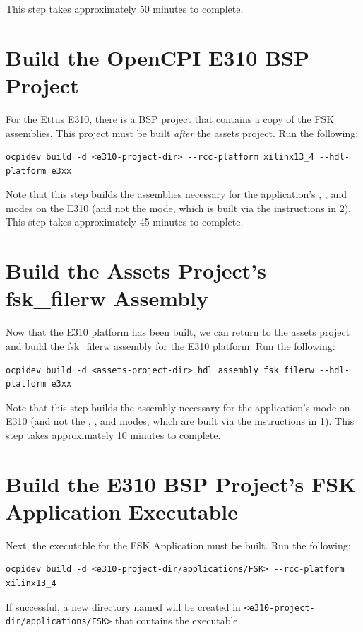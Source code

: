 \begin{flushleft}
This step takes approximately 50 minutes to complete.

\section{Build the OpenCPI E310 BSP Project}
\label{sec:build_bsp_asms}
For the Ettus E310, there is a BSP project that contains a copy of the FSK assemblies. This project must be built \textit{after} the assets project. Run the following:
\begin{lstlisting}
ocpidev build -d <e310-project-dir> --rcc-platform xilinx13_4 --hdl-platform e3xx
\end{lstlisting}
Note that this step builds the assemblies necessary for the application's , , and  modes on the E310 (and not the  mode, which is built via the instructions in \ref{sec:build_assets_asm}).
This step takes approximately 45 minutes to complete.

\section{Build the Assets Project's fsk\_filerw Assembly}
\label{sec:build_assets_asm}
Now that the E310 platform has been built, we can return to the assets project and build the fsk\_filerw assembly for the E310 platform. Run the following:
\begin{lstlisting}
ocpidev build -d <assets-project-dir> hdl assembly fsk_filerw --hdl-platform e3xx
\end{lstlisting}
Note that this step builds the assembly necessary for the application's  mode on E310 (and not the , , and  modes, which are built via the instructions in \ref{sec:build_bsp_asms}).
This step takes approximately 10 minutes to complete.


\section{Build the E310 BSP Project's FSK Application Executable}
Next, the executable for the FSK Application must be built. Run the following:
\begin{lstlisting}
ocpidev build -d <e310-project-dir/applications/FSK> --rcc-platform xilinx13_4
\end{lstlisting}
	If successful, a new directory named  will be created in \verb|<e310-project-dir/applications/FSK>| that contains the executable.


\end{flushleft}
